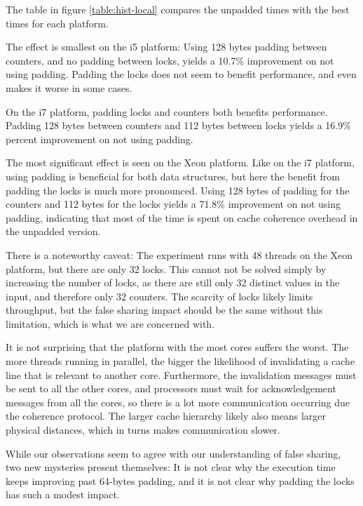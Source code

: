 The table in figure \ref{table:hist-local} compares the unpadded times with the
best times for each platform.

The effect is smallest on the i5 platform: Using 128 bytes padding between
counters, and no padding between locks, yields a 10.7\% improvement on not using
padding. Padding the locks does not seem to benefit performance, and even makes
it worse in some cases.

On the i7 platform, padding locks and counters both benefits performance.
Padding 128 bytes between counters and 112 bytes between locks yields a 16.9\%
percent improvement on not using padding.

The most significant effect is seen on the Xeon platform. Like on the i7
platform, using padding is beneficial for both data structures, but here the
benefit from padding the locks is much more pronounced. Using 128 bytes of
padding for the counters and 112 bytes for the locks yields a 71.8\% improvement
on not using padding, indicating that most of the time is spent on cache
coherence overhead in the unpadded version.

There is a noteworthy caveat: The experiment runs with 48 threads on the Xeon
platform, but there are only 32 locks.
This cannot not be solved simply by increasing the
number of locks, as there are still only 32 distinct values in the input, and
therefore only 32 counters.
The scarcity of locks likely limits
throughput, but the false sharing impact should be the same without
this limitation, which is what we are concerned with.

It is not surprising that the platform with the most cores suffers the worst.
The more threads running in parallel, the bigger the likelihood of invalidating
a cache line that is relevant to another core. Furthermore, the invalidation
messages must be sent to all the other cores, and processors must wait for
acknowledgement messages from all the cores, so there is a lot more
communication occurring due the coherence protocol. The larger cache hierarchy
likely also means larger physical distances, which in turns makes communication
slower.

While our observations seem to agree with our understanding of false sharing,
two new mysteries present themselves: It is not clear why the execution time
keeps improving past 64-bytes padding, and it is not clear why padding the locks
has such a modest impact.

